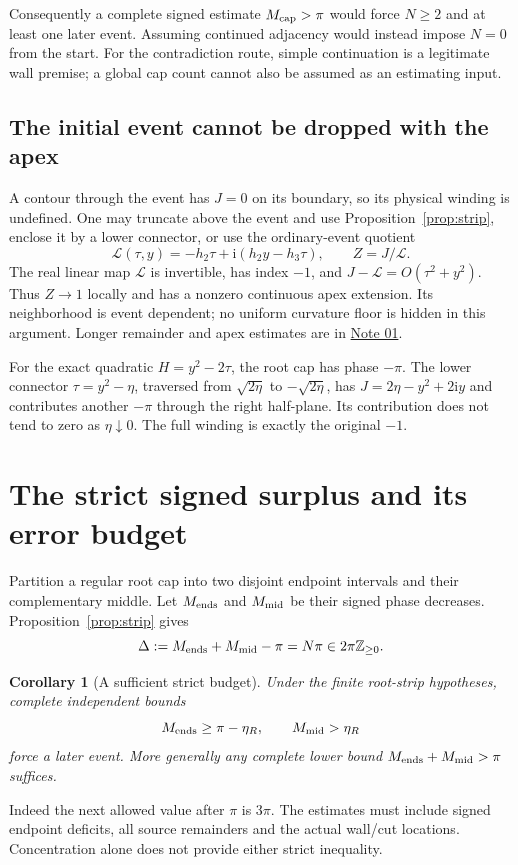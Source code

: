 \documentclass[11pt]{article}
\newtheorem{corollary}[theorem]{Corollary}
\theoremstyle{definition}
\newcommand{\ii}{\mathrm i}
\begin{document}
Consequently a complete signed estimate \(M_{\rm cap}>\pi\) would force
\(N\ge2\) and at least one later event. Assuming continued adjacency
would instead impose \(N=0\) from the start. For the contradiction route,
simple continuation is a legitimate wall premise; a global cap count
cannot also be assumed as an estimating input.

\subsection{The initial event cannot be dropped with the apex}
A contour through the event has \(J=0\) on its boundary, so its physical
winding is undefined. One may truncate above the event and use
Proposition~\ref{prop:strip}, enclose it by a lower connector, or use
the ordinary-event quotient
\[
 \mathcal L(\tau,y)=-h_2\tau+\ii(h_2y-h_3\tau),\qquad Z=J/\mathcal L.
\]
The real linear map \(\mathcal L\) is invertible, has index \(-1\),
and \(J-\mathcal L=O(\tau^2+y^2)\). Thus \(Z\to1\) locally and has
a nonzero continuous apex extension. Its neighborhood is event
dependent; no uniform curvature floor is hidden in this argument.
Longer remainder and apex estimates are in
\href{../notes/01_FINITE_CONTOUR_AND_SOURCE_CONTRACT_20261020.md}{Note 01}.

For the exact quadratic \(H=y^2-2\tau\), the root cap has phase
\(-\pi\). The lower connector \(\tau=y^2-\eta\), traversed from
\(\sqrt{2\eta}\) to \(-\sqrt{2\eta}\), has
\(J=2\eta-y^2+2\ii y\) and contributes another \(-\pi\) through the
right half-plane. Its contribution does not tend to zero as
\(\eta\downarrow0\). The full winding is exactly the original \(-1\).

\section{The strict signed surplus and its error budget}
\label{sec:surplus}
Partition a regular root cap into two disjoint endpoint intervals and
their complementary middle. Let \(M_{\rm ends}\) and \(M_{\rm mid}\)
be their signed phase decreases. Proposition~\ref{prop:strip} gives
\begin{equation}
 \Delta:=M_{\rm ends}+M_{\rm mid}-\pi=N\pi
                 \in 2\pi\mathbb Z_{\ge0}.       \label{eq:surplus}
\end{equation}
\begin{corollary}[A sufficient strict budget]\label{cor:budget}
Under the finite root-strip hypotheses, complete independent bounds
\[
 M_{\rm ends}\ge\pi-\eta_R,\qquad M_{\rm mid}>\eta_R
\]
force a later event. More generally any complete lower bound
\(M_{\rm ends}+M_{\rm mid}>\pi\) suffices.
\end{corollary}
Indeed the next allowed value after \(\pi\) is \(3\pi\).
The estimates must include signed endpoint deficits, all source
remainders and the actual wall/cut locations. Concentration alone
does not provide either strict inequality.
\end{document}
